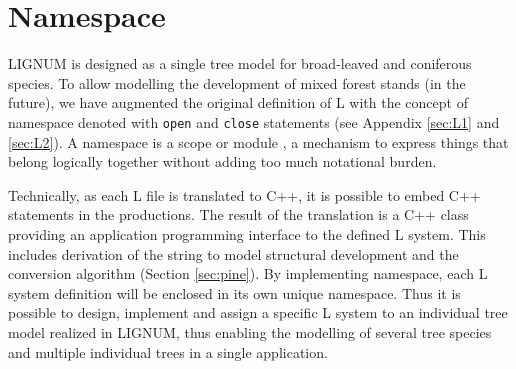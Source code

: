 \section{Namespace}\label{sec:namespace}  

LIGNUM  is  designed as  a  single  tree  model for  broad-leaved  and
coniferous  species.   To allow  modelling  the  development of  mixed
forest  stands  (in  the  future),  we  have  augmented  the  original
definition  of   L  with  the   concept  of  namespace   denoted  with
\texttt{open} and \texttt{close} statements (see Appendix \ref{sec:L1}
and   \ref{sec:L2}).     A   namespace   is   a    scope   or   module
\citep{stroustrup:97},  a  mechanism  to  express things  that  belong
logically together without adding too much notational burden.
 
Technically, as  each L file is  translated to C++, it  is possible to
embed C++ statements in the productions. The result of the translation
is a C++  class providing an application programming  interface to the
defined L  system.  This  includes derivation of  the string  to model
structural   development  and   the   conversion  algorithm   (Section
\ref{sec:pine}).  By implementing  namespace, each L system definition
will be enclosed  in its own unique namespace. Thus  it is possible to
design, implement and assign a specific L system to an individual tree
model realized in LIGNUM, thus  enabling the modelling of several tree
species and multiple individual trees in a single application.

